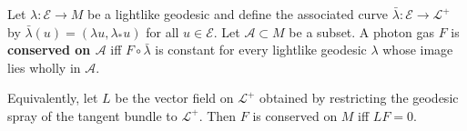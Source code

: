 Let $\lambda: \mathcal{E} \to M$ be a lightlike geodesic and define the associated curve $\bar{\lambda}: \mathcal{E} \to \mathcal{L}^+$ by $\bar{\lambda}(u) = (\lambda u, \lambda_* u)$ for all $u \in \mathcal{E}$. Let $\mathcal{A} \subset M$ be a subset. A photon gas $F$ is \textbf{conserved on $\mathcal{A}$} iff $F \circ \bar{\lambda}$ is constant for every lightlike geodesic $\lambda$ whose image lies wholly in $\mathcal{A}$.

Equivalently, let $L$ be the vector field on $\mathcal{L}^+$ obtained by restricting the geodesic spray of the tangent bundle to $\mathcal{L}^+$. Then $F$ is conserved on $M$ iff $L F = 0$.
